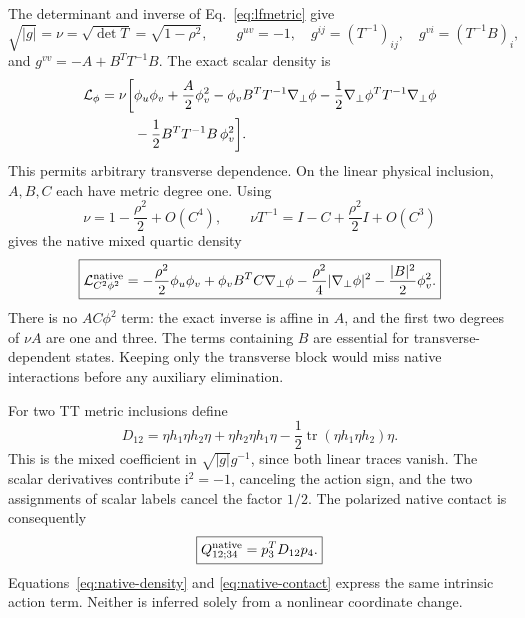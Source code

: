 \documentclass[11pt]{article}
\newcommand{\tr}{\operatorname{tr}}
\newcommand{\ii}{\mathrm i}
\begin{document}
The determinant and inverse of Eq.~\eqref{eq:lfmetric} give
\begin{equation}
 \sqrt{|g|}=\nu=\sqrt{\det T}=\sqrt{1-\rho^2},\qquad
 g^{uv}=-1,\quad g^{ij}=(T^{-1})_{ij},\quad g^{vi}=(T^{-1}B)_i,
 \label{eq:inverse1}
\end{equation}
and \(g^{vv}=-A+B^TT^{-1}B\).
The exact scalar density is
\begin{align}
 \mathcal L_\phi=\nu\bigg[
 &\phi_u\phi_v+\frac{A}{2}\phi_v^2
 -\phi_vB^TT^{-1}\nabla_\perp\phi
 -\frac12\nabla_\perp\phi^TT^{-1}\nabla_\perp\phi\notag\\
 &-\frac12B^TT^{-1}B\,\phi_v^2\bigg].
 \label{eq:scalar-exact}
\end{align}
This permits arbitrary transverse dependence.
On the linear physical inclusion, \(A,B,C\) each have metric degree one.
Using
\begin{equation}
 \nu=1-\frac{\rho^2}{2}+O(C^4),\qquad
 \nu T^{-1}=I-C+\frac{\rho^2}{2}I+O(C^3)
 \label{eq:nu-expansion}
\end{equation}
gives the native mixed quartic density
\begin{equation}
 \boxed{\mathcal L^{\rm native}_{C^2\phi^2}
 =-\frac{\rho^2}{2}\phi_u\phi_v
 +\phi_vB^TC\nabla_\perp\phi
 -\frac{\rho^2}{4}|\nabla_\perp\phi|^2
 -\frac{|B|^2}{2}\phi_v^2.}
 \label{eq:native-density}
\end{equation}
There is no \(AC\phi^2\) term: the exact inverse is affine in \(A\), and the first two degrees of \(\nu A\) are one and three.
The terms containing \(B\) are essential for transverse-dependent states.
Keeping only the transverse block would miss native interactions before any auxiliary elimination.

For two TT metric inclusions define
\begin{equation}
 D_{12}=\eta h_1\eta h_2\eta+\eta h_2\eta h_1\eta
 -\frac12\tr(\eta h_1\eta h_2)\eta.
 \label{eq:D12}
\end{equation}
This is the mixed coefficient in \(\sqrt{|g|}g^{-1}\), since both linear traces vanish.
The scalar derivatives contribute \(\ii^2=-1\), canceling the action sign, and the two assignments of scalar labels cancel the factor \(1/2\).
The polarized native contact is consequently
\begin{equation}
 \boxed{Q^{\rm native}_{12;34}=p_3^TD_{12}p_4.}
 \label{eq:native-contact}
\end{equation}
Equations~\eqref{eq:native-density} and \eqref{eq:native-contact} express the same intrinsic action term.
Neither is inferred solely from a nonlinear coordinate change.
\end{document}
